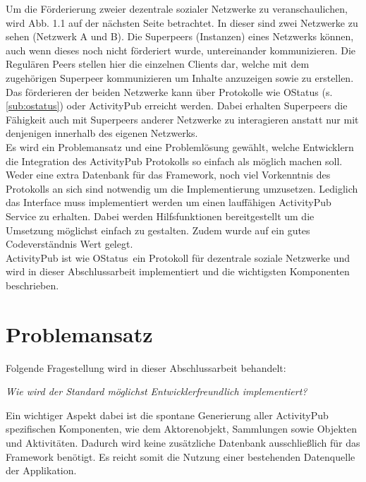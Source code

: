 {	Um die Förderierung zweier dezentrale sozialer Netzwerke zu veranschaulichen, wird Abb. 1.1 auf der nächsten Seite betrachtet. In dieser sind zwei Netzwerke zu sehen (Netzwerk A und B). Die Superpeers (Instanzen) eines Netzwerks können, auch wenn dieses noch nicht förderiert wurde, untereinander kommunizieren. Die Regulären Peers stellen hier die einzelnen Clients dar, welche mit dem zugehörigen Superpeer kommunizieren um Inhalte anzuzeigen sowie zu erstellen. Das förderieren der beiden Netzwerke kann über Protokolle wie OStatus (s. \ref{sub:ostatus}) oder ActivityPub erreicht werden. Dabei erhalten Superpeers die Fähigkeit auch mit Superpeers anderer Netzwerke zu interagieren anstatt nur mit denjenigen innerhalb des eigenen Netzwerks.\\
	
	Es wird ein Problemansatz und eine Problemlösung gewählt, welche Entwicklern die Integration des ActivityPub Protokolls so einfach als möglich machen soll. Weder eine extra Datenbank für das Framework, noch viel Vorkenntnis des Protokolls an sich sind notwendig um die Implementierung umzusetzen. Lediglich das Interface muss implementiert werden um einen lauffähigen ActivityPub Service zu erhalten. Dabei werden Hilfsfunktionen bereitgestellt um die Umsetzung möglichst einfach zu gestalten. Zudem wurde auf ein gutes Codeverständnis Wert gelegt.\\
	
	ActivityPub ist wie \glqq OStatus\grqq~ein Protokoll für dezentrale soziale Netzwerke und wird in dieser Abschlussarbeit implementiert und die wichtigsten Komponenten beschrieben.
	
	\section{Problemansatz}
	Folgende Fragestellung wird in dieser Abschlussarbeit behandelt:
	\begin{addmargin}[1cm]{1cm}
		\vspace{0.5cm}
		\textit{Wie wird der Standard möglichst Entwicklerfreundlich implementiert?}
		\vspace{0.5cm}
	\end{addmargin}
	Ein wichtiger Aspekt dabei ist die spontane Generierung aller ActivityPub spezifischen Komponenten, wie dem Aktorenobjekt, Sammlungen sowie Objekten und Aktivitäten. Dadurch wird keine zusätzliche Datenbank ausschließlich für das Framework benötigt. Es reicht somit die Nutzung einer bestehenden Datenquelle der Applikation.\\
	
}
